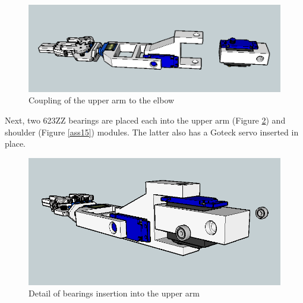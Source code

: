 




	\begin{figure}[H]
			\centering
			\includegraphics[scale=0.5]{images/Assembly/11.png}
			\caption{Coupling of the upper arm to the elbow }
			\label{ass11}
	\end{figure}
	\bigskip






Next, two 623ZZ bearings are placed each into the upper arm (Figure \ref{ass13}) and shoulder (Figure \ref{ass15}) modules. The latter also has a Goteck
servo inserted in place.\\

	\begin{figure}[H]
			\centering
			\includegraphics[scale=0.5]{images/Assembly/13.png}
			\caption{Detail of bearings insertion into the upper arm }
			\label{ass13}
	\end{figure}
	\bigskip



